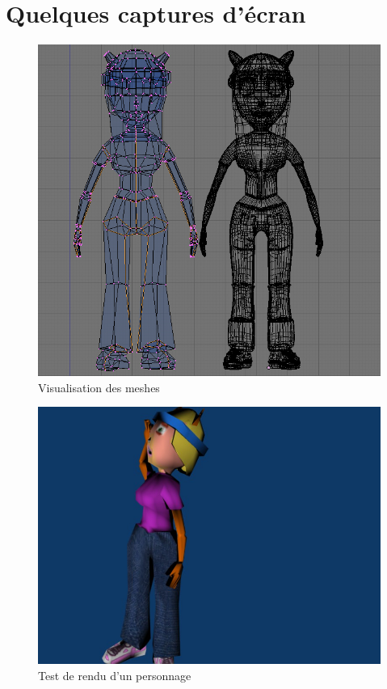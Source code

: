 \section{Quelques captures d'écran}
\begin{figure}[h]
	\center
	\includegraphics[scale=0.4]{visuel/mesh.jpg}
	\caption{Visualisation des meshes}
\end{figure}

\begin{figure}[!h]
	\center
	\includegraphics[scale=0.4]{visuel/rendu_test1.jpg}
	\caption{Test de rendu d'un personnage}
\end{figure}

